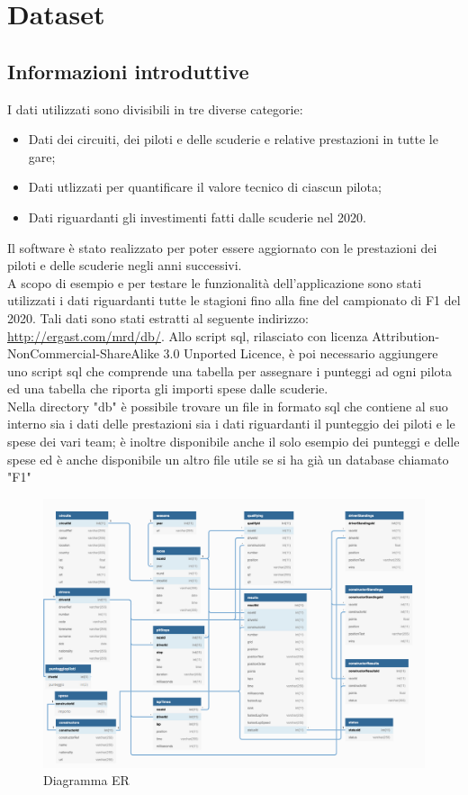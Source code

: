 \chapter{Dataset}
\label{sec:dataset}


\section[Informazioni introduttive]{Informazioni introduttive} %
I dati utilizzati sono divisibili in tre diverse categorie:
\begin{itemize}
\item  Dati dei circuiti, dei piloti e delle scuderie e relative prestazioni in tutte le gare;
\item  Dati utlizzati per quantificare il valore tecnico di ciascun pilota;
\item  Dati riguardanti gli investimenti fatti dalle scuderie nel 2020.
\end{itemize}
Il software è stato realizzato per poter essere aggiornato con le prestazioni dei piloti e delle scuderie negli anni successivi.\\
A scopo di esempio e per testare le funzionalità dell'applicazione sono stati utilizzati i dati riguardanti tutte le stagioni fino alla fine del campionato di F1 del 2020. Tali dati sono stati estratti al seguente indirizzo: \href{http://ergast.com/mrd/db/}{http://ergast.com/mrd/db/}. Allo script sql, rilasciato con licenza Attribution-NonCommercial-ShareAlike 3.0 Unported Licence, è poi necessario aggiungere uno script sql che comprende una tabella per assegnare i punteggi ad ogni pilota ed una tabella che riporta gli importi spese dalle scuderie.\\
Nella directory "db" è possibile trovare un file in formato sql che contiene al suo interno sia i dati delle prestazioni sia i dati riguardanti il punteggio dei piloti e le spese dei vari team; è inoltre disponibile anche il solo esempio dei punteggi e delle spese ed è anche disponibile un altro file utile se si ha già un database chiamato "F1"

\begin{figure}[h]
\centering
\includegraphics[width=1\linewidth]{images/Diagramma ER.png}
\caption{Diagramma ER}
\label{fig:Diagramma ER}
\end{figure}

